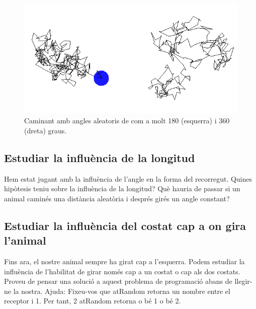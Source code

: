 \begin{figure}[h!]
\begin{center}
\includegraphics[scale=0.4]{Imatges/figura23-3}
\end{center}
\caption{Caminant amb angles aleatoris de com a molt 180 (esquerra) i 360 (dreta) graus.}
\label{fig2303}
\end{figure}

\subsection{Estudiar la influència de la longitud}
Hem estat jugant amb la influència de l'angle en la forma del recorregut. Quines hipòtesis teniu sobre la influència de la longitud? Què hauria de passar si un animal caminés una distància aleatòria i després girés un angle constant?

\subsection{Estudiar la influència del costat cap a on gira l'animal}
Fins ara, el nostre animal sempre ha girat cap a l'esquerra. Podem estudiar la influència de l'habilitat de girar només cap a un costat o cap als dos costats. Proveu de pensar una solució a aquest problema de programació abans de llegir-ne la nostra. Ajuda: Fixeu-vos que \textsf{atRandom} retorna un nombre entre el receptor i 1. Per tant, \textsf{2 atRandom} retorna o bé 1 o bé 2.

